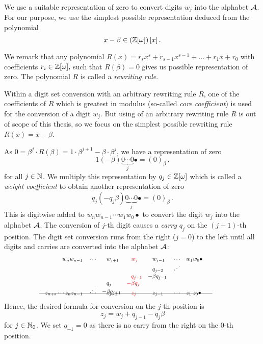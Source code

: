   We use a suitable representation of zero to convert digits $w_j$ into the alphabet $\mathcal{A}$. 
  For our purpose, we use the simplest possible representation deduced from the polynomial
  $$
    x-\beta \in \left(\mathbb{Z}[\omega]\right)[x]\,.
  $$

We remark that any polynomial $R(x)=r_s x^s+r_{s-1}x^{s-1}+ \dots + r_1 x+r_0$ with coefficients $r_i \in \mathbb{Z}[\omega],$ such that $R(\beta)=0$ gives us possible representation of zero. The polynomial $R$ is called a \emph{rewriting rule}. 

Within a digit set conversion with an arbitrary rewriting rule $R$, one of the coefficients of $R$ which is greatest in modulus (so-called \emph{core coefficient}) is used for the conversion of a digit $w_j$. But using of an arbitrary rewriting rule $R$ is out of scope of this thesis, so we focus on the simplest possible rewriting rule $R(x)=x-\beta$.
  
As $0=\beta^{j} \cdot R(\beta)=1\cdot \beta^{j+1} -\beta \cdot \beta^{j}$, we have a representation of zero 
$$1 (-\!\beta) \underbrace{0 \cdots 0}_{j}\bullet = (0)_\beta\,. $$
for all $j \in \mathbb{N}$. We multiply this representation by $q_j \in \mathbb{Z}[\omega]$ which is called a \emph{weight coefficient} to obtain another  representation of zero 
$$q_j (-q_j\beta) \underbrace{0 \cdots 0}_{j}\bullet = (0)_\beta\,. $$ 
This is digitwise added to $w_{n} w_{n-1}\cdots w_1 w_0 \bullet$ to convert the digit $w_j$ into the alphabet $\mathcal{A}$. The conversion of $j$-th digit causes a \emph{carry} $q_{j}$ on the $(j+1)$-th position. The digit set conversion runs from the right ($j=0$) to the left until all digits and carries are converted into the alphabet $\mathcal{A}$:
        \begin{align}
        \label{eq:conversionScheme}
            \hspace{100pt}  w_n w_{n-1}&&&\cdots& &w_{j+1}&\!\! &\textcolor{red}{w_j}  & \!\!  &w_{j-1} &&\cdots &&w_1 w_0\bullet \hspace{100pt} \notag\\[-5pt]
                         &&&&       &       & &     &   &q_{j-2} &&\iddots  \notag \\[-3pt] 
                         &&&&       &       & &\textcolor{red}{q_{j-1}}& -&\beta q_{j-1} \notag \\[-3pt]
                         &&&&         &q_j&   \textcolor{red}{-}&\textcolor{red}{\beta q_j} &&\\[-8pt]
                         &&&  \iddots      &   -&\beta q_{j+1}&   &\ && \notag \\[-17pt]
          \intertext{\hspace{60pt}\line(1,0){300}}
          \notag \\[-30pt]
           z_{n+s} \cdots z_{n} z_{n-1}&&&\cdots& &z_{j+1}& &\textcolor{red}{z_j}& &z_{j-1} &&\cdots &&z_1 \; z_0\bullet \notag                  
        \end{align}
    Hence, the desired formula for conversion on the $j$-th position is 
    \begin{equation*}
        z_j=w_j + q_{j-1} - q_j \beta
    \end{equation*}
    for $j \in \mathbb{N}_0$. We set $q_{-1}=0$ as there is no carry from the right on the 0-th position.
    
